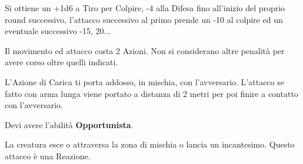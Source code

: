\documentclass[landscape,10pt,a4paper]{article}
\begin{document}
\begin{multicols}{3}
\begin{dmbox}[title=Carica - pagina \pageref{carica}]
Si ottiene un +1d6 a Tiro per Colpire, -4 alla Difesa fino all'inizio del proprio round successivo, l'attacco successivo al primo prende un -10 al colpire ed un eventuale successivo -15, 20...

Il movimento ed attacco costa 2 Azioni. Non si considerano altre penalità per avere corso oltre quelli indicati.

L'Azione di Carica ti porta addosso, in mischia, con l'avversario. L'attacco se fatto con arma lunga viene portato a distanza di 2 metri per poi finire a contatto con l'avversario.
\end{dmbox}

\begin{dmbox}[title=Attacco di Opportunita' - pagina \pageref{attaccoopportunita}]
Devi avere l'abilità \textbf{Opportunista}.

La creatura esce o attraversa la zona di mischia o lancia un incantesimo. Questo attacco è una Reazione.
\end{dmbox}

\begin{dmbox}[title=Azioni per Round - pagina \pageref{azioninelround}]
	

\end{dmbox}
\end{multicols}
\end{document}
